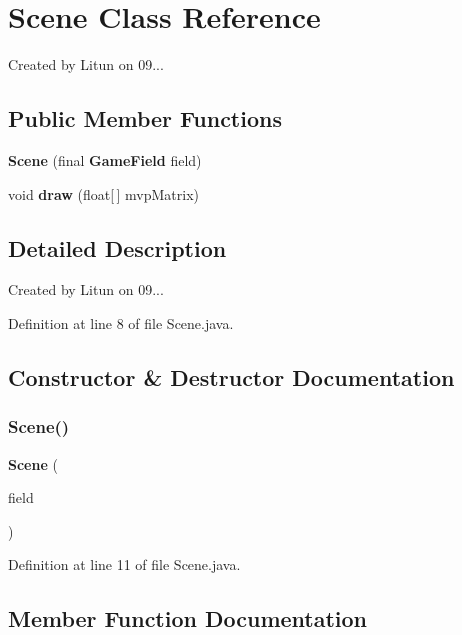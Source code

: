 \section{Scene Class Reference}
\label{classsf_1_1unitingtwist_1_1_scene}


Created by Litun on 09...  


\subsection*{Public Member Functions}
\begin{DoxyCompactItemize}
\item 
\textbf{ Scene} (final \textbf{ Game\+Field} field)
\item 
void \textbf{ draw} (float[$\,$] mvp\+Matrix)
\end{DoxyCompactItemize}


\subsection{Detailed Description}
Created by Litun on 09... 

Definition at line 8 of file Scene.\+java.



\subsection{Constructor \& Destructor Documentation}
\mbox{\label{classsf_1_1unitingtwist_1_1_scene_ace890167c04c77a3bc42f2f095611528}} 
\subsubsection{Scene()}
{\footnotesize\ttfamily \textbf{ Scene} (\begin{DoxyParamCaption}\item[{final \textbf{ Game\+Field}}]{field }\end{DoxyParamCaption})}



Definition at line 11 of file Scene.\+java.



\subsection{Member Function Documentation}
\mbox{\label{classsf_1_1unitingtwist_1_1_scene_ace8a0d2a4e41b6d83897d48fd91a7ab3}} 
